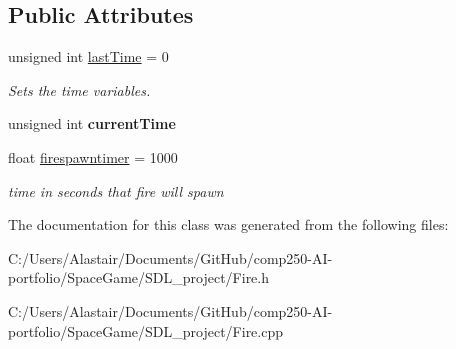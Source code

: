 \subsection*{Public Attributes}
\begin{DoxyCompactItemize}
\item 
\mbox{\label{class_fire_acb6bb3c895c92c8ac03595b6f8962ba0}} 
unsigned int \hyperlink{class_fire_acb6bb3c895c92c8ac03595b6f8962ba0}{last\+Time} = 0
\begin{DoxyCompactList}\small\item\em Sets the time variables. \end{DoxyCompactList}\item 
\mbox{\label{class_fire_ae62b26ad098d04b06bf873925995e284}} 
unsigned int {\bfseries current\+Time}
\item 
\mbox{\label{class_fire_a9a0d858289975b93c3dc729d9b75cf95}} 
float \hyperlink{class_fire_a9a0d858289975b93c3dc729d9b75cf95}{firespawntimer} = 1000
\begin{DoxyCompactList}\small\item\em time in seconds that fire will spawn \end{DoxyCompactList}\end{DoxyCompactItemize}


The documentation for this class was generated from the following files\+:\begin{DoxyCompactItemize}
\item 
C\+:/\+Users/\+Alastair/\+Documents/\+Git\+Hub/comp250-\/\+A\+I-\/portfolio/\+Space\+Game/\+S\+D\+L\+\_\+project/Fire.\+h\item 
C\+:/\+Users/\+Alastair/\+Documents/\+Git\+Hub/comp250-\/\+A\+I-\/portfolio/\+Space\+Game/\+S\+D\+L\+\_\+project/Fire.\+cpp\end{DoxyCompactItemize}
